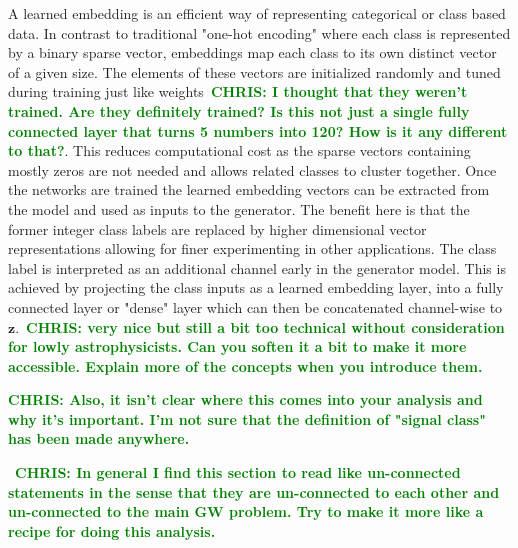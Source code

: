 \documentclass[12pt]{iopart}
\newcommand{\chris}[1]{\textbf{\textcolor{green}{CHRIS: #1}}}
\begin{document}
%
A learned embedding is an efficient way of representing categorical or class
based data. In contrast to traditional "one-hot encoding" where each class is
represented by a binary sparse vector, embeddings map each class to its own
distinct vector of a given size. The elements of these vectors are initialized
randomly and tuned during training just like weights~\chris{I thought that they
weren't trained. Are they definitely trained? Is this not just a single fully
connected layer that turns 5 numbers into 120? How is it any different to
that?}. This reduces computational cost as the sparse vectors containing mostly
zeros are not needed and allows related classes to cluster together. Once the
networks are trained the learned embedding vectors can be extracted from the
model and used as inputs to the generator. The benefit here is that the former
integer class labels are replaced by higher dimensional vector representations
allowing for finer experimenting in other applications. The class label is
interpreted as an additional channel early in the generator model. This is
achieved by projecting the class inputs as a learned embedding layer, into a
fully connected layer or "dense" layer which can then be concatenated
channel-wise to $\textbf{z}$.~\chris{very nice but still a bit too technical
without consideration for lowly astrophysicists. Can you soften it a bit to
make it more accessible. Explain more of the concepts when you introduce them.} 

\chris{Also, it isn't clear where this comes into your analysis and why it's
important. I'm not sure that the definition of "signal class" has been made
anywhere.}

~\chris{In general I find this section to read like un-connected statements in
the sense that they are un-connected to each other and un-connected to the main
GW problem. Try to make it more like a recipe for doing this analysis.}

\end{document}
